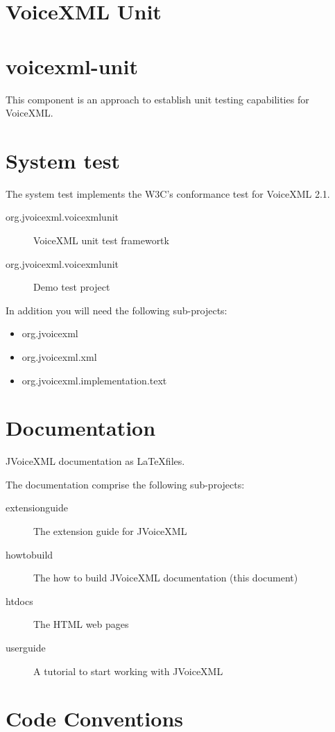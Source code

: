 \documentclass[11pt,a4paper]{article}
\begin{document}
\section{VoiceXML Unit}
\section{voicexml-unit}

This component is an approach to establish unit testing capabilities for
VoiceXML.

\section{System test}

The system test implements the W3C's conformance test for VoiceXML 2.1.

\begin{description}
\item[org.jvoicexml.voicexmlunit] VoiceXML unit test framewortk
\item[org.jvoicexml.voicexmlunit] Demo test project
\end{description}

In addition you will need the following sub-projects:
\begin{itemize}
\item org.jvoicexml
\item org.jvoicexml.xml
\item org.jvoicexml.implementation.text
\end{itemize} 

\section{Documentation}

JVoiceXML documentation as \LaTeX files.

The documentation comprise the following sub-projects:

\begin{description}
\item[extensionguide] The extension guide for JVoiceXML
\item[howtobuild] The how to build JVoiceXML documentation (this document)
\item[htdocs] The HTML web pages
\item[userguide] A tutorial to start working with JVoiceXML
\end{description}

\section{Code Conventions}
\label{sec:code-conventions}
\end{document}
